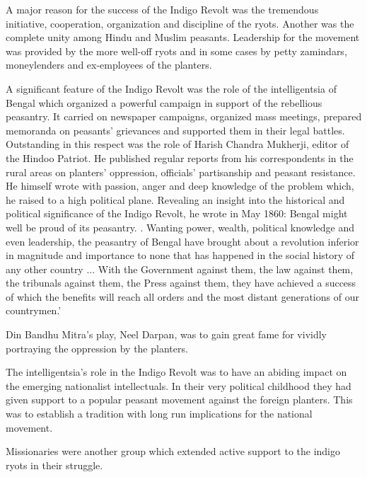 A major reason for the success of the Indigo Revolt was the tremendous initiative, cooperation, organization and discipline of the ryots. Another was the complete unity among Hindu and Muslim peasants. Leadership for the movement was provided by the more well-off ryots and in some cases by petty zamindars, moneylenders and ex-employees of the planters.

A significant feature of the Indigo Revolt was the role of the intelligentsia of Bengal which organized a powerful campaign in support of the rebellious peasantry. It carried on newspaper campaigns, organized mass meetings, prepared memoranda on peasants' grievances and supported them in their legal battles. Outstanding in this respect was the role of Harish Chandra Mukherji, editor of the Hindoo Patriot. He published regular reports from his correspondents in the rural areas on planters' oppression, officials' partisanship and peasant resistance. He himself wrote with passion, anger and deep knowledge of the problem which, he raised to a high political plane. Revealing an insight into the historical and political significance of the Indigo Revolt, he wrote in May 1860: Bengal might well be proud of its peasantry. . Wanting power, wealth, political knowledge and even leadership, the peasantry of Bengal have brought about a revolution inferior in magnitude and importance to none that has happened in the social history of any other country ... With the Government against them, the law against them, the tribunals against them, the Press against them, they have achieved a success of which the benefits will reach all orders and the most distant generations of our countrymen.'

Din Bandhu Mitra's play, Neel Darpan, was to gain great fame for vividly portraying the oppression by the planters.

The intelligentsia's role in the Indigo Revolt was to have an abiding impact on the emerging nationalist intellectuals. In their very political childhood they had given support to a popular peasant movement against the foreign planters. This was to establish a tradition with long run implications for the national movement.

Missionaries were another group which extended active support to the indigo ryots in their struggle.

